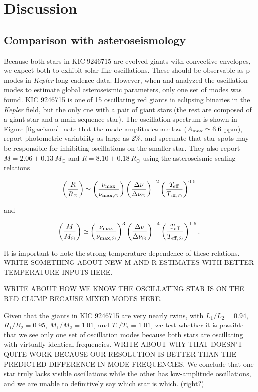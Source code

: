 \section{Discussion}\label{discuss}

\subsection{Comparison with asteroseismology}\label{seismo}

Because both stars in KIC 9246715 are evolved giants with convective envelopes, we expect both to exhibit solar-like oscillations. These should be observable as p-modes in \emph{Kepler} long-cadence data. However, when \citet{gau13} and \citet{gau14} analyzed the oscillation modes to estimate global asteroseismic parameters, only one set of modes was found. KIC 9246715 is one of 15 oscillating red giants in eclipsing binaries in the \emph{Kepler} field, but the only one with a pair of giant stars (the rest are composed of a giant star and a main sequence star). The oscillation spectrum is shown in Figure \ref{fig:seismo}. \citet{gau14} note that the mode amplitudes are low ($A_{\rm{max}} \simeq 6.6$ ppm), report photometric variability as large as 2\%, and speculate that star spots may be responsible for inhibiting oscillations on the smaller star. They also report $M = 2.06 \pm 0.13 \ M_{\odot}$ and $R = 8.10 \pm 0.18 \ R_{\odot}$ using the asteroseismic scaling relations

\begin{equation}
\left( \frac{R}{R_\odot} \right) \simeq \left( \frac{\nu_{\rm{max}}}{\nu_{\rm{max,\odot}}} \right) \left( \frac{\Delta \nu}{\Delta \nu_\odot} \right)^{-2} \left( \frac{T_{\rm{eff}}}{T_{\rm{eff,\odot}}} \right)^{0.5}
\end{equation}

and

\begin{equation}
\left( \frac{M}{M_\odot} \right) \simeq {\left( \frac{\nu_{\rm{max}}}{\nu_{\rm{max,\odot}}} \right)}^{3} \left( \frac{\Delta \nu}{\Delta \nu_\odot} \right)^{-4} \left( \frac{T_{\rm{eff}}}{T_{\rm{eff,\odot}}} \right)^{1.5}.
\end{equation}

It is important to note the strong temperature dependence of these relations. WRITE SOMETHING ABOUT NEW M AND R ESTIMATES WITH BETTER TEMPERATURE INPUTS HERE. 

WRITE ABOUT HOW WE KNOW THE OSCILLATING STAR IS ON THE RED CLUMP BECAUSE MIXED MODES HERE.

Given that the giants in KIC 9246715 are very nearly twins, with $L_1/L_2 = 0.94$, $R_1/R_2 = 0.95$, $M_1/M_2 = 1.01$, and $T_1/T_2 = 1.01$, we test whether it is possible that we see only one set of oscillation modes because both stars are oscillating with virtually identical frequencies. WRITE ABOUT WHY THAT DOESN'T QUITE WORK BECAUSE OUR RESOLUTION IS BETTER THAN THE PREDICTED DIFFERENCE IN MODE FREQUENCIES. We conclude that one star truly lacks visible oscillations while the other has low-amplitude oscillations, and we are unable to definitively say which star is which. (right?)